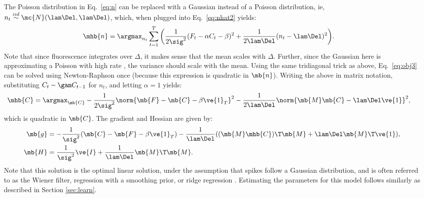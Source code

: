 The Poisson distribution in Eq.~\eqref{eq:n} can be replaced with a Gaussian instead of a Poisson distribution, ie,  $n_t \overset{iid}{\sim} \mc{N}(\lam \Del, \lam \Del)$, which, when plugged into Eq.~\eqref{eq:nhat2} yields:
\begin{align} \label{eq:obj5}
\mhb{n} &= \argmax_{n_t}  \sum_{t=1}^T \bigg( \frac{1}{2 \sig^2}(F_t - \alpha C_t - \beta)^2  + 
 \frac{1}{2 \lam \Del}(n_t - \lam \Del)^2\bigg).
\end{align}
Note that since fluorescence integrates over $\Delta$, it makes sense that the mean scales with $\Delta$.  Further, since the Gaussian here is approximating a Poisson with high rate \cite{SjulsonMiesenbock07}, the variance should scale with the mean.  Using the same tridiagonal trick as above, Eq.~\eqref{eq:obj3} can be solved using Newton-Raphson once (because this expression is quadratic in $\mb{n}$).  Writing the above in matrix notation, substituting $C_t - \gam C_{t-1}$ for $n_t$, and letting $\alpha=1$ yields:
\begin{align}   \label{eq:w2}
\mhb{C}&= \argmax_{\mb{C}} -\frac{1}{2\sig^2} \norm{\mb{F} - \mb{C} - \beta\ve{1}_T}^2 - \frac{1}{2\lam\Del} \norm{\mb{M} \mb{C} - \lam\Del\ve{1}}^2,
\end{align}
\noindent which is quadratic in $\mb{C}$.  The gradient and Hessian are given by:
\begin{align}
\mb{g} &= -\frac{1}{\sig^2} (\mb{C} - \mb{F} - \beta\ve{1}_T) - \frac{1}{\lam\Del} ( (\mb{M} \mhb{C})\T \mb{M} + \lam\Del \mb{M}\T \ve{1}), \\
\mb{H} &= \frac{1}{\sig^2} \ve{I} + \frac{1}{\lam\Del} \mb{M}\T \mb{M}.
\end{align}
Note that this solution is the optimal linear solution, under the assumption that spikes follow a Gaussian distribution, and is often referred to as the Wiener filter, regression with a smoothing prior, or ridge regression \cite{CONV04}.  Estimating the parameters for this model follows similarly as described in Section \ref{sec:learn}.
